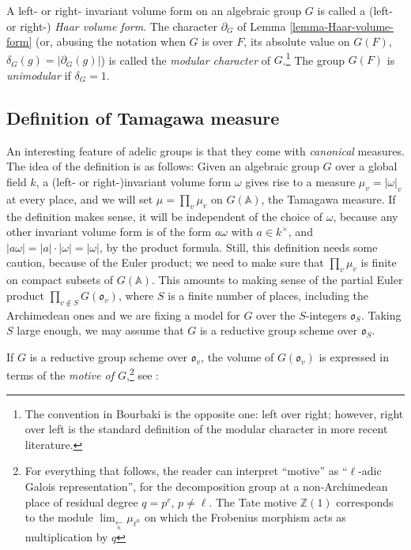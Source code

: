 \begin{definition}
\label{definition-modular-character}
		A left- or right- invariant volume form on an algebraic group $G$ is called a (left- or right-) {\it Haar volume form}. The character $\partial_G$ of Lemma \ref{lemma-Haar-volume-form} (or, abusing the notation when $G$ is over $F$, its absolute value on $G(F)$, $\delta_G(g) = |\partial_G(g)|$) is called the {\it modular character} of $G$.\footnote{The convention in Bourbaki is the opposite one: left over right; however, right over left is the standard definition of the modular character in more recent literature.} The group $G(F)$ is {\it unimodular} if $\delta_G=1$.
\end{definition}
	
	
	
\subsection{Definition of Tamagawa measure}
\label{subsection-definition-tamagawa}

An interesting feature of adelic groups is that they come with \emph{canonical} measures. The idea of the definition is as follows: Given an algebraic group $G$ over a global field $k$, a (left- or right-)invariant volume form $\omega$ gives rise to a measure $\mu_v = |\omega|_v$ at every place, and we will set $\mu=\prod_v \mu_v$ on $G(\mathbb{A})$, the Tamagawa measure. If the definition makes sense, it will be independent of the choice of $\omega$, because any other invariant volume form is of the form $a\omega$ with $a\in k^\times$, and $|a\omega|=|a|\cdot |\omega|=|\omega|$, by the product formula. Still, this definition needs some caution, because of the Euler product; we need to make sure that $\prod_v \mu_v$ is finite on compact subsets of $G(\mathbb{A})$. This amounts to making sense of the partial Euler product $\prod_{v\notin S} G(\mathfrak o_v)$, where $S$ is a finite number of places, including the Archimedean ones and we are fixing a model for $G$  over the $S$-integers $\mathfrak o_S$. Taking $S$ large enough, we may assume that $G$ is a reductive group scheme over $\mathfrak o_S$.

If $G$ is a reductive group scheme over $\mathfrak o_v$, the volume of $G(\mathfrak o_v)$ is expressed in terms of the \emph{motive of $G$},\footnote{For everything that follows, the reader can interpret ``motive'' as ``$\ell$-adic Galois representation'', for the decomposition group at a non-Archimedean place of residual degree $q=p^r$, $p\ne \ell$. The Tate motive $\mathbb Z(1)$ corresponds to the module $\lim_{\underset{n}\leftarrow} \mu_{\ell^n}$ on which the Frobenius morphism acts as multiplication by $q$}  see \cite{Gross-motive}:
	
